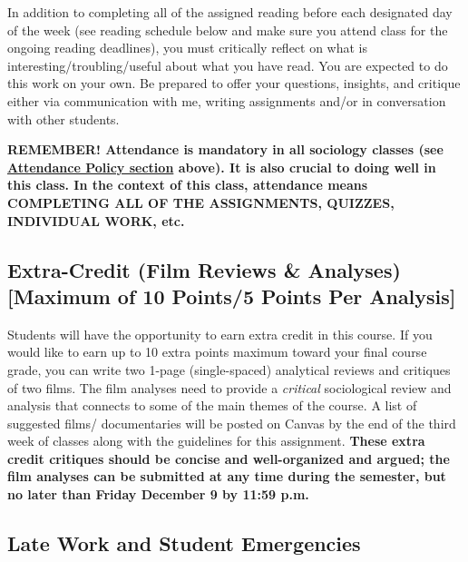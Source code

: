 \documentclass[11pt,]{article}
\begin{document}
In addition to completing all of the assigned reading before each
designated day of the week (see reading schedule below and make sure you
attend class for the ongoing reading deadlines), you must critically
reflect on what is interesting/troubling/useful about what you have
read. You are expected to do this work on your own. Be prepared to offer
your questions, insights, and critique either via communication with me,
writing assignments and/or in conversation with other students.

\textbf{REMEMBER! Attendance is mandatory in all sociology classes (see
\protect\hyperlink{attendance}{Attendance Policy section} above). It is
also crucial to doing well in this class. In the context of this class,
attendance means COMPLETING ALL OF THE ASSIGNMENTS, QUIZZES, INDIVIDUAL
WORK, etc.}

\hypertarget{extra-credit-film-reviews-analyses-maximum-of-10-points5-points-per-analysis}{%
\subsection{Extra-Credit (Film Reviews \& Analyses) {[}Maximum of 10
Points/5 Points Per
Analysis{]}}\label{extra-credit-film-reviews-analyses-maximum-of-10-points5-points-per-analysis}}

Students will have the opportunity to earn extra credit in this course.
If you would like to earn up to 10 extra points maximum toward your
final course grade, you can write two 1-page (single-spaced) analytical
reviews and critiques of two films. The film analyses need to provide a
\emph{critical} sociological review and analysis that connects to some
of the main themes of the course. A list of suggested films/
documentaries will be posted on Canvas by the end of the third week of
classes along with the guidelines for this assignment. \textbf{These
extra credit critiques should be concise and well-organized and argued;
the film analyses can be submitted at any time during the semester, but
no later than Friday December 9 by 11:59 p.m.}

\hypertarget{late-work-and-student-emergencies}{%
\subsection{Late Work and Student
Emergencies}\label{late-work-and-student-emergencies}}
\end{document}
